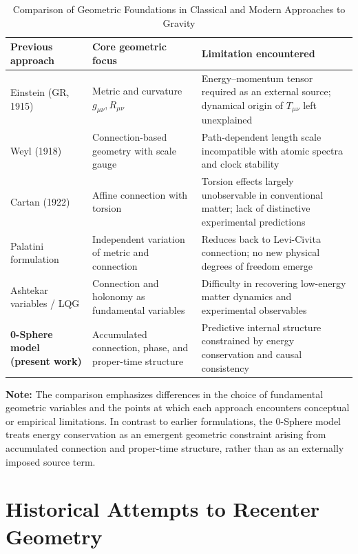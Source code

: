 \documentclass[%
 reprint,
 amsmath,amssymb,
 aps,
 prb,
]{revtex4-2}
\numberwithin{equation}{section}
\begin{document}
\begin{table}[t!]
\centering
\caption{Comparison of Geometric Foundations in Classical and Modern Approaches to Gravity}
\label{tab:historical_comparison_geometry}
\renewcommand{\arraystretch}{1.4}
\begin{tabular}{p{5.0cm}p{5.5cm}p{5.5cm}}
\toprule
\textbf{Previous approach} & \textbf{Core geometric focus} & \textbf{Limitation encountered} \\
\midrule
Einstein (GR, 1915) & Metric and curvature $g_{\mu\nu}, R_{\mu\nu}$ & Energy--momentum tensor required as an external source; dynamical origin of $T_{\mu\nu}$ left unexplained \\
\addlinespace[0.3cm]
Weyl (1918) & Connection-based geometry with scale gauge & Path-dependent length scale incompatible with atomic spectra and clock stability \\
\addlinespace[0.3cm]
Cartan (1922) & Affine connection with torsion & Torsion effects largely unobservable in conventional matter; lack of distinctive experimental predictions \\
\addlinespace[0.3cm]
Palatini formulation & Independent variation of metric and connection & Reduces back to Levi-Civita connection; no new physical degrees of freedom emerge \\
\addlinespace[0.3cm]
Ashtekar variables / LQG & Connection and holonomy as fundamental variables & Difficulty in recovering low-energy matter dynamics and experimental observables \\
\addlinespace[0.3cm]
\textbf{0-Sphere model (present work)} & Accumulated connection, phase, and proper-time structure & Predictive internal structure constrained by energy conservation and causal consistency \\
\bottomrule
\end{tabular}
\vspace{0.2cm}
\begin{flushleft}
\footnotesize
\textbf{Note:} The comparison emphasizes differences in the choice of fundamental geometric variables and the points at which each approach encounters conceptual or empirical limitations. 
In contrast to earlier formulations, the 0-Sphere model treats energy conservation as an emergent geometric constraint arising from accumulated connection and proper-time structure, rather than as an externally imposed source term.
\end{flushleft}
\end{table}

\section{Historical Attempts to Recenter Geometry}
\label{sec:historical}
\end{document}
